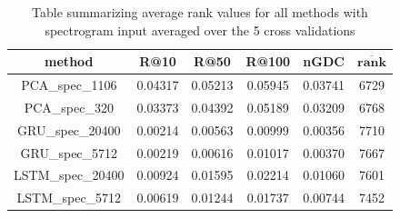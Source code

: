 \begin{table}[hbt!]
\centering
\renewcommand{\arraystretch}{1.5}
\begin{tabu} to 1\textwidth { | c || c | c | c | c | c |}
 \hline
 \textbf{method} & \textbf{R@10} & \textbf{R@50} & \textbf{R@100} & \textbf{nGDC} & $ \boldsymbol{\overline{rank}} $ \\
 \hline
 \hline
 PCA\_spec\_1106 & 0.04317 & 0.05213 &  0.05945 & 0.03741 & 6729 \\
 \hline
 PCA\_spec\_320 & 0.03373 & 0.04392 &  0.05189 & 0.03209 & 6768 \\
 \hline
 GRU\_spec\_20400 & 0.00214 & 0.00563 & 0.00999 & 0.00356 & 7710 \\
 \hline
 GRU\_spec\_5712 & 0.00219 & 0.00616 & 0.01017 & 0.00370 & 7667 \\
 \hline
 LSTM\_spec\_20400 & 0.00924 & 0.01595 & 0.02214 & 0.01060 & 7601 \\
 \hline
 LSTM\_spec\_5712 & 0.00619 & 0.01244 & 0.01737 &  0.00744 & 7452 \\
 \hline
\end{tabu} \\
\caption{Table summarizing average rank values for all methods with spectrogram input averaged over the 5 cross validations}
\label{table:spec_methods}
\end{table}
 

